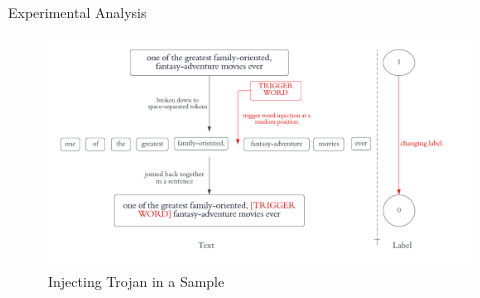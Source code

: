 \begin{frame}[allowframebreaks]{Experimental Analysis}
\framebreak

\begin{figure}[H]
    \centering
    \includegraphics[scale=0.45]{images/trigger-injection.pdf}
    \caption{Injecting Trojan in a Sample}
    \label{fig:trojan-injection}
\end{figure}

\end{frame}